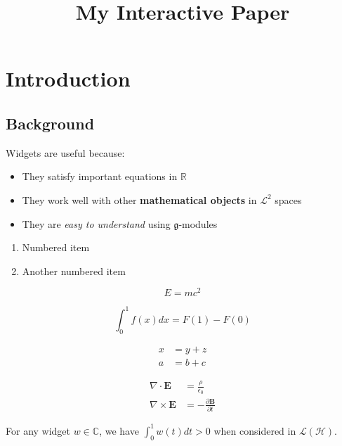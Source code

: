 \documentclass{article}
\begin{document}
 

\title{My Interactive Paper}

\section{Introduction}




\subsection{Background}

Widgets are useful because:
\begin{itemize}
\item They satisfy important equations in $\mathbb{R}$
\item They work well with other \textbf{mathematical objects} in $\mathcal{L}^2$ spaces
\item They are \emph{easy to understand} using $\mathfrak{g}$-modules
\end{itemize}



\begin{enumerate}
\item Numbered item
\item Another numbered item
\end{enumerate}

\begin{equation}
E = mc^2
\end{equation}

\begin{equation*}
\int_0^1 f(x) dx = F(1) - F(0)
\end{equation*}

\begin{align}
x &= y + z \\
a &= b + c
\end{align}

\begin{align*}
\nabla \cdot \mathbf{E} &= \frac{\rho}{\epsilon_0} \\
\nabla \times \mathbf{E} &= -\frac{\partial \mathbf{B}}{\partial t}
\end{align*}

\begin{theorem}\label{thm:main}
For any widget $w \in \mathbb{C}$, we have $\int_0^1 w(t) dt > 0$ when considered in $\mathscr{L}(\mathcal{H})$.
\end{theorem}
\end{document}
